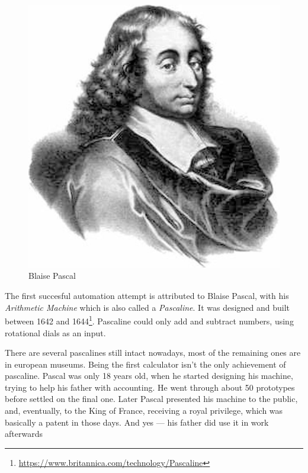 \documentclass[../../what-is-computer]{subfiles}
\begin{document}
    \begin{figure}
        \centering
        \includegraphics[scale=0.1]{images/persons/person_blaise_pascal.jpg}
        \caption{Blaise Pascal}
    \end{figure}

    The first succesful automation attempt is attributed to Blaise Pascal, with his \emph{Arithmetic Machine} which is also called a \emph{Pascaline}.
    It was designed and built between 1642 and 1644\footnote{\href{https://www.britannica.com/technology/Pascaline}{https://www.britannica.com/technology/Pascaline}}. 
    Pascaline could only add and subtract numbers, using rotational dials as an input.\par



    There are several pascalines still intact nowadays, most of the remaining ones are in european museums. Being the first calculator isn't the only achievement
    of pascaline. Pascal was only 18 years old, when he started designing his machine, trying to help his father with accounting. He went through about 50 prototypes
    before settled on the final one. Later Pascal presented his machine to the public, and, eventually, to the King of France, receiving a royal privilege, which 
    was basically a patent in those days. And yes --- his father did use it in work afterwards \par
\end{document}
